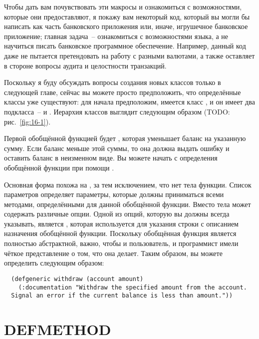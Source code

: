 Чтобы дать вам почувствовать эти макросы и ознакомиться с возможностями, которые они
предоставляют, я покажу вам некоторый код, который вы могли бы написать как часть
банковского приложения или, иначе, игрушечное банковское приложение; главная задача~--
ознакомиться с возможностями языка, а не научиться писать банковское программное
обеспечение.  Например, данный код даже не пытается претендовать на работу с разными
валютами, а также оставляет в стороне вопросы аудита и целостности транзакций.

Поскольку я буду обсуждать вопросы создания новых классов только в следующей главе, сейчас
вы можете просто предположить, что определённые классы уже существуют: для начала
предположим, имеется класс , и он имеет два подкласса~--
 и .  Иерархия классов выглядит следующим
образом (TODO: рис.~\ref{fig:16-1}).


Первой обобщённой функцией будет , которая уменьшает баланс на указанную
сумму.  Если баланс меньше этой суммы, то она должна выдать ошибку и оставить баланс в
неизменном виде.  Вы можете начать с определения обобщённой функции при помощи
.

Основная форма  похожа на , за тем исключением, что нет тела
функции.  Список параметров  определяет параметры, которые должны
приниматься всеми методами, определёнными для данной обобщённой функции.  Вместо тела
 может содержать различные опции.  Одной из опций, которую вы должны
всегда указывать, является , которая используется для указания строки
с описанием назначения обобщённой функции.  Поскольку обобщённая функция является
полностью абстрактной, важно, чтобы и пользователь, и программист имели чёткое
представление о том, что она делает.  Таким образом, вы можете определить 
следующим образом:

\begin{lstlisting}
  (defgeneric withdraw (account amount)
    (:documentation "Withdraw the specified amount from the account.
  Signal an error if the current balance is less than amount."))
\end{lstlisting}

\section{DEFMETHOD}

